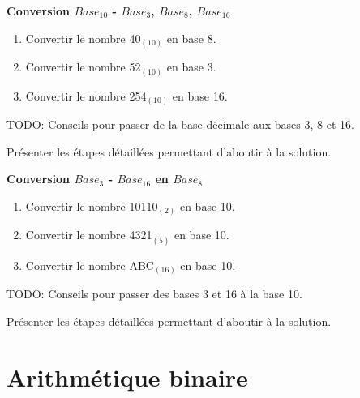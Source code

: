 \begin{Exercice}[15 minutes]  \textbf{Conversion $Base_{10}$ - $Base_3$, $Base_8$, $Base_{16}$}\\
    \begin{enumerate}
        \item Convertir le nombre 40$_{(10)}$ en base 8.
        \item Convertir le nombre 52$_{(10)}$ en base 3.
        \item Convertir le nombre 254$_{(10)}$ en base 16.
    \end{enumerate}

    \begin{conseil}
        TODO: Conseils pour passer de la base décimale aux bases 3, 8 et 16.
    \end{conseil}
    \begin{solution}
        Présenter les étapes détaillées permettant d'aboutir à la solution.
    \end{solution}
\end{Exercice}

\begin{Exercice}[15 minutes] \textbf{Conversion $Base_{3}$ - $Base_{16}$ en $Base_8$}
    \begin{enumerate}
        \item Convertir le nombre 10110$_{(2)}$ en base 10.
        \item Convertir le nombre 4321$_{(5)}$ en base 10.
        \item Convertir le nombre ABC$_{(16)}$ en base 10.
    \end{enumerate}
    \begin{conseil}
        TODO: Conseils pour passer des bases 3 et 16 à la base 10.
    \end{conseil}
    \begin{solution}
        Présenter les étapes détaillées permettant d'aboutir à la solution.
    \end{solution}

\end{Exercice}
\newpage

\section{Arithmétique binaire}

